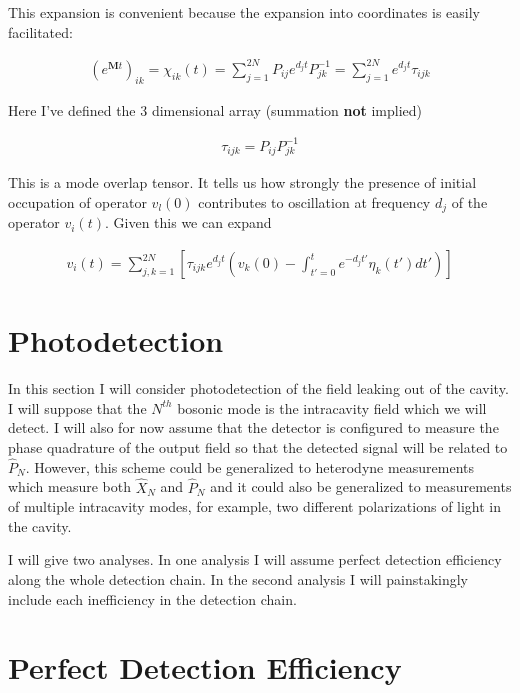 \documentclass[12pt]{article}
\newcommand{\bv}[1]{\boldsymbol{#1}}
\begin{document}
This expansion is convenient because the expansion into coordinates is easily facilitated:

\begin{align}
\left(e^{\bv{M}t}\right)_{ik} = \chi_{ik}(t) = \sum_{j=1}^{2N} P_{ij} e^{d_j t} P^{-1}_{jk} = \sum_{j=1}^{2N} e^{d_j t} \tau_{ijk}
\end{align}

Here I've defined the 3 dimensional array (summation \textbf{not} implied)

\begin{align}
\tau_{ijk} = P_{ij}P^{-1}_{jk}
\end{align}

This is a mode overlap tensor. It tells us how strongly the presence of initial occupation of operator $v_l(0)$ contributes to oscillation at frequency $d_j$ of the operator $v_i(t)$. Given this we can expand

\begin{align}
v_i(t) = \sum_{j,k=1}^{2N}\left[\tau_{ijk}e^{d_j t}\left(v_k(0) - \int_{t'=0}^t e^{-d_j t'} \eta_k(t')dt' \right)\right]
\end{align}



\section{Photodetection}

In this section I will consider photodetection of the field leaking out of the cavity. I will suppose that the $N^{th}$ bosonic mode is the intracavity field which we will detect. I will also for now assume that the detector is configured to measure the phase quadrature of the output field so that the detected signal will be related to $\hat{P}_N$. However, this scheme could be generalized to heterodyne measurements which measure both $\hat{X}_N$ and $\hat{P}_N$ and it could also be generalized to measurements of multiple intracavity modes, for example, two different polarizations of light in the cavity.

I will give two analyses. In one analysis I will assume perfect detection efficiency along the whole detection chain. In the second analysis I will painstakingly include each inefficiency in the detection chain.

\section{Perfect Detection Efficiency}
\end{document}
